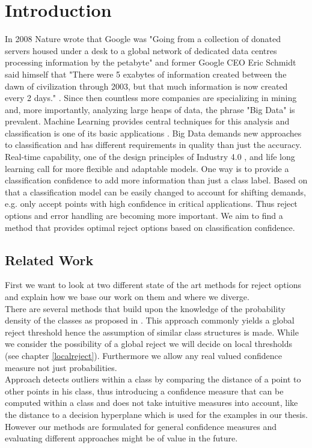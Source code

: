 %
\chapter{Introduction}
\label{sec:intro}

In 2008 Nature wrote that Google was "Going from a collection of donated servers housed under a desk to a global network of dedicated data centres processing information by the petabyte" \cite{Nat:2008} and former Google CEO Eric Schmidt said himself that "There were 5 exabytes of information created between the dawn of civilization through 2003, but that much information is now created every 2 days." \cite{Mar:2015}. Since then countless more companies are specializing in mining and, more importantly, analyzing large heaps of data, the phrase "Big Data" is prevalent. Machine Learning provides central techniques for this analysis and classification is one of its basic applications \cite[p. 5]{Alp:2010}. Big Data demands new approaches to classification and has different requirements in quality than just the accuracy. Real-time capability, one of the design principles of Industry 4.0 \cite[p. 12]{Her:2015}, and life long learning \cite[p. 3]{Sut:2014} call for more flexible and adaptable models. One way is to provide a classification confidence \cite{Del:2005} to add more information than just a class label. Based on that a classification model can be easily changed to account for shifting demands, e.g. only accept points with high confidence in critical applications. Thus reject options and error handling are becoming more important. We aim to find a method that provides optimal reject options based on classification confidence.

\section{Related Work}
First we want to look at two different state of the art methods for reject options and explain how we base our work on them and where we diverge. \\
There are several methods that build upon the knowledge of the probability density of the classes as proposed in \cite{Cho:1970}. This approach commonly yields a global reject threshold hence the assumption of similar class structures is made. While we consider the possibility of a global reject we will decide on local thresholds (see chapter \ref{localreject}). Furthermore we allow any real valued confidence measure not just probabilities. \\
Approach \cite{Sug:2013} detects outliers within a class by comparing the distance of a point to other points in his class, thus introducing a confidence measure that can be computed within a class and does not take intuitive measures into account, like the distance to a decision hyperplane which is used for the examples in our thesis. However our methods are formulated for general confidence measures and evaluating different approaches might be of value in the future.

